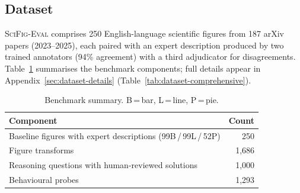 \subsection{Dataset}
\label{sec:dataset}

\textsc{SciFig-Eval} comprises 250 English-language scientific figures from 187 arXiv papers (2023--2025), each paired with an expert description produced by two trained annotators (94\% agreement) with a third adjudicator for disagreements. Table~\ref{tab:dataset-summary} summarises the benchmark components; full details appear in Appendix~\ref{sec:dataset-details} (Table~\ref{tab:dataset-comprehensive}).

\begin{table}[t]
\centering
\scriptsize
\setlength{\tabcolsep}{3pt}
\begin{tabular}{@{}lr@{}}
\toprule
\textbf{Component} & \textbf{Count} \\
\midrule
Baseline figures with expert descriptions (99B\,/\,99L\,/\,52P) & 250 \\
Figure transforms & 1{,}686 \\
Reasoning questions with human-reviewed solutions & 1{,}000 \\
Behavioural probes & 1{,}293 \\
\bottomrule
\end{tabular}
\caption{Benchmark summary. B\,=\,bar, L\,=\,line, P\,=\,pie.}
\label{tab:dataset-summary}
\end{table}
